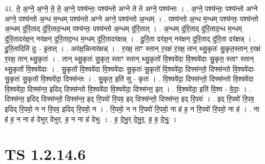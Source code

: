 \documentclass[17pt]{extarticle}
\begin{document}
41. ते॒ अ॒ग्ने॒ अ॒ग्ने॒ ते॒ ते॒ अ॒ग्ने॒ पश्य॑न्तः॒ पश्य॑न्तो अग्ने ते ते अग्ने॒ पश्य॑न्तः । . अ॒ग्ने॒ पश्य॑न्तः॒ पश्य॑न्तो अग्ने अग्ने॒ पश्य॑न्तो अ॒न्ध म॒न्धम् पश्य॑न्तो अग्ने अग्ने॒ पश्य॑न्तो अ॒न्धम् । . पश्य॑न्तो अ॒न्ध म॒न्धम् पश्य॑न्तः॒ पश्य॑न्तो अ॒न्धम् दु॑रि॒ताद् दु॑रि॒ताद॒न्धम् पश्य॑न्तः॒ पश्य॑न्तो अ॒न्धम् दु॑रि॒तात् । . अ॒न्धम् दु॑रि॒ताद् दु॑रि॒ताद॒न्ध म॒न्धम् दु॑रि॒तादर॑क्ष॒न् नर॑क्षन् दुरि॒ताद॒न्ध म॒न्धम् दु॑रि॒तादर॑क्षन्न् । . दु॒रि॒ता दर॑क्ष॒न् नर॑क्षन् दुरि॒ताद् दु॑रि॒ता दर॑क्षन्न् । . दु॒रि॒तादिति॑ दुः - इ॒तात् । . अर॑क्ष॒न्नित्यर॑क्षन्न् । . र॒रक्ष॒ ताꣳ स्तान् र॒रक्ष॑ र॒रक्ष॒ तान् थ्सु॒कृतः॑ सु॒कृत॒स्तान् र॒रक्ष॑ र॒रक्ष॒ तान् थ्सु॒कृतः॑ । . तान् थ्सु॒कृतः॑ सु॒कृत॒ स्ताꣳ स्तान् थ्सु॒कृतो॑ वि॒श्ववे॑दा वि॒श्ववे॑दाः सु॒कृत॒ स्ताꣳ स्तान् थ्सु॒कृतो॑ वि॒श्ववे॑दाः । . सु॒कृतो॑ वि॒श्ववे॑दा वि॒श्ववे॑दाः सु॒कृतः॑ सु॒कृतो॑ वि॒श्ववे॑दा॒ दिफ्स॑न्तो॒ दिफ्स॑न्तो वि॒श्ववे॑दाः सु॒कृतः॑ सु॒कृतो॑ वि॒श्ववे॑दा॒ दिफ्स॑न्तः । . सु॒कृत॒ इति॑ सु - कृतः॑ । . वि॒श्ववे॑दा॒ दिफ्स॑न्तो॒ दिफ्स॑न्तो वि॒श्ववे॑दा वि॒श्ववे॑दा॒ दिफ्स॑न्त॒ इदिद् दिफ्स॑न्तो वि॒श्ववे॑दा वि॒श्ववे॑दा॒ दिफ्स॑न्त॒ इत् । . वि॒श्ववे॑दा॒ इति॑ वि॒श्व - वे॒दाः॒ । . दिफ्स॑न्त॒ इदिद् दिफ्स॑न्तो॒ दिफ्स॑न्त॒ इद् रि॒पवो॑ रि॒पव॒ इद् दिफ्स॑न्तो॒ दिफ्स॑न्त॒ इद् रि॒पवः॑ । . इद् रि॒पवो॑ रि॒पव॒ इदिद् रि॒पवो॒ न न रि॒पव॒ इदिद् रि॒पवो॒ न । . रि॒पवो॒ न न रि॒पवो॑ रि॒पवो॒ ना ह॑ ह॒ न रि॒पवो॑ रि॒पवो॒ ना ह॑ । . ना ह॑ ह॒ न ना ह॑ देभुर् देभुर्. ह॒ न ना ह॑ देभुः । . ह॒ दे॒भु॒र् दे॒भु॒र्॒. ह॒ ह॒ दे॒भुः॒ । \newline
\pagebreak
{}

\section{ TS 1.2.14.6 }
\end{document}
